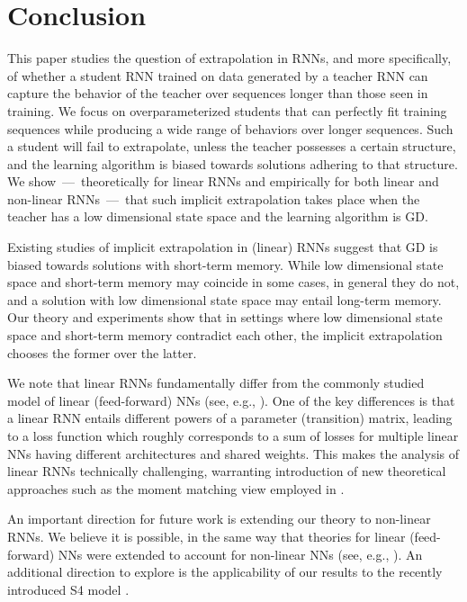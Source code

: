 \section{Conclusion}\label{sec:conclusions}

This paper studies the question of extrapolation in RNNs, and more specifically, of whether a student RNN trained on data generated by a teacher RNN can capture the behavior of the teacher over sequences longer than those seen in training. 
We focus on overparameterized students that can perfectly fit training sequences while producing a wide range of behaviors over longer sequences. 
Such a student will fail to extrapolate, unless the teacher possesses a certain structure, and the learning algorithm is biased towards solutions adhering to that structure.
We show~---~theoretically for linear RNNs and empirically for both linear and non-linear RNNs~---~that such implicit extrapolation takes place when the teacher has a low dimensional state space and the learning algorithm is GD.%

Existing studies of implicit extrapolation in (linear) RNNs \citep{emami2021implicit,cohen2022extrapolation} suggest that GD is biased towards solutions with short-term memory.
While low dimensional state space and short-term memory may coincide in some cases, in general they do not, and a solution with low dimensional state space may entail long-term memory.
Our theory and experiments show that in settings where low dimensional state space and short-term memory contradict each other, the implicit extrapolation chooses the former over the latter.%

We note that linear RNNs fundamentally differ from the commonly studied model of linear (feed-forward) NNs (see, e.g., \cite{arora2018optimization,ji2018gradient,arora2019convergence,arora2019implicit,razin2020implicit}). 
One of the key differences is that a linear RNN entails different powers of a parameter (transition) matrix, leading to a loss function which roughly corresponds to a sum of losses for multiple linear NNs having different architectures and shared weights.
This makes the analysis of linear RNNs technically challenging, warranting introduction of new theoretical approaches such as the moment matching view employed in . 

An important direction for future work is extending our theory to non-linear RNNs. 
We believe it is possible, in the same way that theories for linear (feed-forward) NNs were extended to account for non-linear NNs (see, e.g., \citet{razin2021implicit,razin2022implicit, lyu2019gradient}).
An additional direction to explore is the applicability of our results to the recently introduced S4 model \citep{gu2022efficiently}.